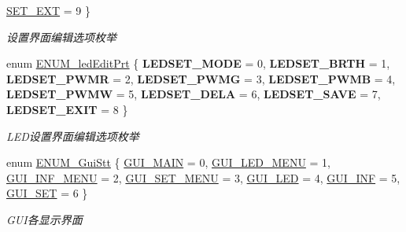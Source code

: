 \begin{DoxyCompactItemize}
\hyperlink{group___g_u_i_gga4ba335d33dd3b563369372b707ab50a2abcd626e21ce9a313ba772bf2b4486b7e}{\-S\-E\-T\-\_\-\-E\-X\-T} =  9
 \}
\begin{DoxyCompactList}\small\item\em 设置界面编辑选项枚举 \end{DoxyCompactList}\item 
enum \hyperlink{group___g_u_i_ga463957e3850829fa9964f1248b3e6e34}{\-E\-N\-U\-M\-\_\-led\-Edit\-Prt} \{ \*
{\bfseries \-L\-E\-D\-S\-E\-T\-\_\-\-M\-O\-D\-E} =  0, 
{\bfseries \-L\-E\-D\-S\-E\-T\-\_\-\-B\-R\-T\-H} =  1, 
{\bfseries \-L\-E\-D\-S\-E\-T\-\_\-\-P\-W\-M\-R} =  2, 
{\bfseries \-L\-E\-D\-S\-E\-T\-\_\-\-P\-W\-M\-G} =  3, 
\*
{\bfseries \-L\-E\-D\-S\-E\-T\-\_\-\-P\-W\-M\-B} =  4, 
{\bfseries \-L\-E\-D\-S\-E\-T\-\_\-\-P\-W\-M\-W} =  5, 
{\bfseries \-L\-E\-D\-S\-E\-T\-\_\-\-D\-E\-L\-A} =  6, 
{\bfseries \-L\-E\-D\-S\-E\-T\-\_\-\-S\-A\-V\-E} =  7, 
\*
{\bfseries \-L\-E\-D\-S\-E\-T\-\_\-\-E\-X\-I\-T} =  8
 \}
\begin{DoxyCompactList}\small\item\em \-L\-E\-D设置界面编辑选项枚举 \end{DoxyCompactList}\item 
enum \hyperlink{group___g_u_i_gac24c5d6f2f41aeaff8bb6052d818c66a}{\-E\-N\-U\-M\-\_\-\-Gui\-Stt} \{ \*
\hyperlink{group___g_u_i_ggac24c5d6f2f41aeaff8bb6052d818c66aab539de0b04d9adb87e8cde109d258d38}{\-G\-U\-I\-\_\-\-M\-A\-I\-N} =  0, 
\hyperlink{group___g_u_i_ggac24c5d6f2f41aeaff8bb6052d818c66aa14b9b2ee71bd003056e1552dadddff45}{\-G\-U\-I\-\_\-\-L\-E\-D\-\_\-\-M\-E\-N\-U} =  1, 
\hyperlink{group___g_u_i_ggac24c5d6f2f41aeaff8bb6052d818c66aacd1fc1d504a638422c2a47dec322151f}{\-G\-U\-I\-\_\-\-I\-N\-F\-\_\-\-M\-E\-N\-U} =  2, 
\hyperlink{group___g_u_i_ggac24c5d6f2f41aeaff8bb6052d818c66aae36c01e85e156efec97bcfc03eeef39c}{\-G\-U\-I\-\_\-\-S\-E\-T\-\_\-\-M\-E\-N\-U} =  3, 
\*
\hyperlink{group___g_u_i_ggac24c5d6f2f41aeaff8bb6052d818c66aa386739881f40d380188dc32ec6584920}{\-G\-U\-I\-\_\-\-L\-E\-D} =  4, 
\hyperlink{group___g_u_i_ggac24c5d6f2f41aeaff8bb6052d818c66aa22bde57822cc7630c6ed151474c02601}{\-G\-U\-I\-\_\-\-I\-N\-F} =  5, 
\hyperlink{group___g_u_i_ggac24c5d6f2f41aeaff8bb6052d818c66aa663df1badda2599a26f855e7dd315032}{\-G\-U\-I\-\_\-\-S\-E\-T} =  6
 \}
\begin{DoxyCompactList}\small\item\em \-G\-U\-I各显示界面 \end{DoxyCompactList}\end{DoxyCompactItemize}
